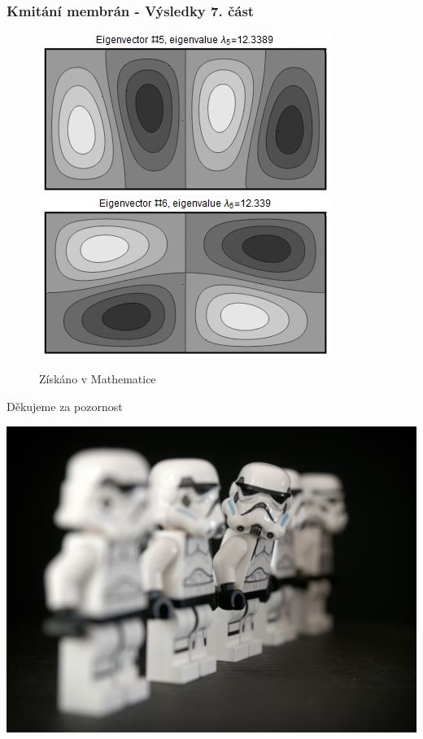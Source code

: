 \documentclass[xcolor=table]{beamer}
\begin{document}
\begin{frame}
\frametitle{Kmitání membrán - Výsledky 7. část}
\centering
\begin{figure}
\includegraphics[width=.6\linewidth]{rectangle-eigenvector-5.png}
\includegraphics[width=.6\linewidth]{rectangle-eigenvector-6.png}
\caption{Získáno v Mathematice}
\end{figure}
\end{frame}

\begin{frame}
\begin{center}
\begin{huge}
Děkujeme za pozornost
\end{huge}
  \centering
  \includegraphics[width=.8\linewidth]{stormtroop.jpg}
\end{center}

\end{frame}
\end{document}

